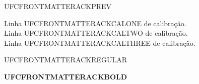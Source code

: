 \documentclass{abntexto-ufc}
\begin{document}
\pretextual

\thispagestyle{empty}
UFCFRONTMATTERACKPREV
\vfill


\thispagestyle{empty}
\begingroup
\onehalfsp
Linha UFCFRONTMATTERACKCALONE de calibração.\\
Linha UFCFRONTMATTERACKCALTWO de calibração.\\
Linha UFCFRONTMATTERACKCALTHREE de calibração.
\par
\vspace{2\baselineskip}
UFCFRONTMATTERACKREGULAR\par
{\bfseries UFCFRONTMATTERACKBOLD\par}
\endgroup
\end{document}
